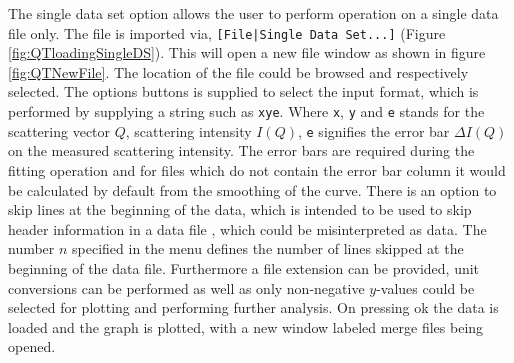 The single data set option allows the user to perform operation on a
single data file only. The file is imported via,
\verb"[File|Single Data Set...]" (Figure \ref{fig:QTloadingSingleDS}).
This will open a new file window as shown in figure
\ref{fig:QTNewFile}. The location of the file could be browsed
and respectively selected. The options buttons is supplied to select
the input format, which is performed by supplying a string such as
\texttt{xye}. Where \texttt{x}, \texttt{y} and \texttt{e} stands for
the scattering vector $Q$, scattering intensity $I(Q)$, \texttt{e}
signifies the error bar $\Delta I(Q)$ on the measured scattering intensity.
The error bars are required during the fitting operation and for files
which do not contain the error bar column it would be calculated by
default from the smoothing of the curve. There is an option to skip
lines at the beginning of the data, which is intended to be used to
skip header information in a data file , which could be misinterpreted
as data. The number $n$ specified in the menu defines the number of
lines skipped at the beginning of the data file.
Furthermore a file extension can be provided, unit conversions can be
performed as well as only non-negative $y$-values could be selected
for plotting and performing further analysis. On pressing ok the
data is loaded and the graph is plotted, with a new window labeled
merge files being opened.


